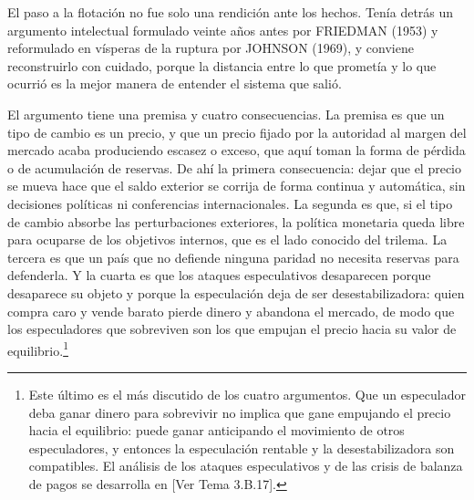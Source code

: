 \documentclass[10pt,a4paper]{article}
\newcommand{\authorfont}[1]{{\fontfamily{EBGaramond-TLF}\selectfont #1}}
\begin{document}
El paso a la flotación no fue solo una rendición ante los hechos. Tenía detrás un argumento intelectual formulado veinte años antes por FRIEDMAN (1953) y reformulado en vísperas de la ruptura por JOHNSON (1969), y conviene reconstruirlo con cuidado, porque la distancia entre lo que prometía y lo que ocurrió es la mejor manera de entender el sistema que salió.

El argumento tiene una premisa y cuatro consecuencias. La premisa es que un tipo de cambio es un precio, y que un precio fijado por la autoridad al margen del mercado acaba produciendo escasez o exceso, que aquí toman la forma de pérdida o de acumulación de reservas. De ahí la primera consecuencia: dejar que el precio se mueva hace que el saldo exterior se corrija de forma continua y automática, sin decisiones políticas ni conferencias internacionales. La segunda es que, si el tipo de cambio absorbe las perturbaciones exteriores, la política monetaria queda libre para ocuparse de los objetivos internos, que es el lado conocido del trilema. La tercera es que un país que no defiende ninguna paridad no necesita reservas para defenderla. Y la cuarta es que los ataques especulativos desaparecen porque desaparece su objeto y porque la especulación deja de ser desestabilizadora: quien compra caro y vende barato pierde dinero y abandona el mercado, de modo que los especuladores que sobreviven son los que empujan el precio hacia su valor de equilibrio.\footnote{%
    Este último es el más discutido de los cuatro argumentos. Que un especulador deba ganar dinero para sobrevivir no implica que gane empujando el precio hacia el equilibrio: puede ganar anticipando el movimiento de otros especuladores, y entonces la especulación rentable y la desestabilizadora son compatibles. El análisis de los ataques especulativos y de las crisis de balanza de pagos se desarrolla en [\authorfont{Ver Tema 3.B.17}].
}
\end{document}
